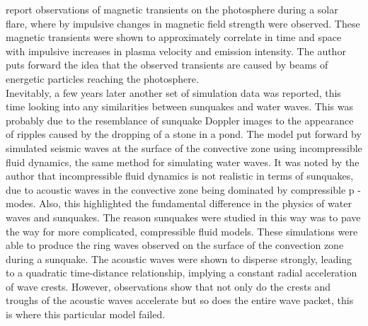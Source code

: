 \documentclass[11pt]{article}
\begin{document}
\cite{2001ApJ...550L.105K} report observations of magnetic transients on the photosphere during a solar flare, where by impulsive changes in magnetic field strength were observed. These magnetic transients were shown to approximately correlate in time and space with impulsive increases in plasma velocity and emission intensity. The author puts forward the idea that the observed transients are caused by beams of energetic particles reaching the photosphere.\\   


Inevitably, a few years later another set of simulation data was reported, this time looking into any similarities between sunquakes and water waves. This was probably due to the resemblance of sunquake Doppler images to the appearance of ripples caused by the dropping of a stone in a pond. The model put forward by \cite{2003SoPh..218..227P} simulated seismic waves at the surface of the convective zone using incompressible fluid dynamics, the same method for simulating water waves. It was noted by the author that incompressible fluid dynamics is not realistic in terms of sunquakes, due to acoustic waves in the convective zone being dominated by compressible p - modes. Also, this highlighted the fundamental difference in the physics of water waves and sunquakes. The reason sunquakes were studied in this way was to pave the way for more complicated, compressible fluid models. These simulations were able to produce the ring waves observed on the surface of the convection zone during a sunquake. The acoustic waves were shown to disperse strongly, leading to a quadratic time-distance relationship, implying a constant radial acceleration of wave crests. However, observations show that not only do the crests and troughs of the acoustic waves accelerate but so does the entire wave packet, this is where this particular model failed.\\
\end{document}
